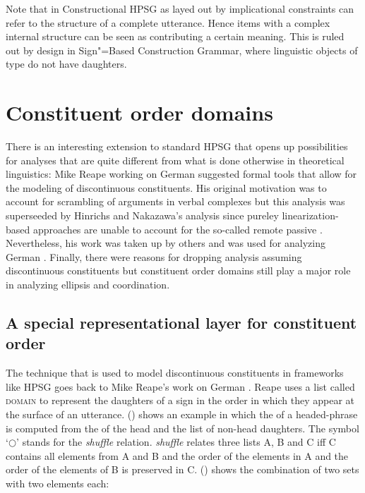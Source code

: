 \documentclass[output=paper]{langsci/langscibook}
\begin{document}
Note that in Constructional HPSG as layed out by  implicational constraints can refer
to the structure of a complete utterance. Hence items with a complex internal structure can be seen
as contributing a certain meaning. This is ruled out by design in Sign"=Based Construction Grammar,
where linguistic objects of type  do not have daughters.


\section{Constituent order domains}
\label{sec-domains}

There is an interesting extension to standard HPSG that opens up possibilities for analyses that are
quite different from what is done otherwise in theoretical linguistics: Mike Reape
\citeyearpar{Reape91,Reape92a,Reape94a} working on German suggested formal tools that allow for the modeling of
discontinuous constituents. His original motivation was to account for scrambling of arguments in
verbal complexes but this analysis was superseeded by Hinrichs and Nakazawa's analysis
\citep{HN89a,HN94a} since pureley linearization-based approaches are unable to account for the
so-called remote passive \citep{Kathol}. Nevertheless, his work was taken up by others and was used for analyzing German
\citep{KP95a,Kathol2000a,Mueller95c,Babel,Mueller2004b,Wetta2011a,Wetta2014a-u}. Finally, there were reasons for dropping
analysis assuming discontinuous constituents \citep{Mueller2005d,MuellerGS1} but constituent order
domains still play a major role in analyzing ellipsis and coordination.

\subsection{A special representational layer for constituent order}

\citet{Reape94a,Kathol2001a,Mueller2004b}

The technique that is used to model discontinuous constituents in frameworks like HPSG goes back to Mike Reape's work on German
\citeyearpar{Reape91,Reape92a,Reape94a}. 
Reape uses a list called \textsc{domain} to represent the daughters of a sign in the order in
which they appear at the surface of an utterance. () shows an example in which the \domv of a
headed-phrase is computed from the \domv of the head and the list of non-head daughters.
\ea
{} \impl
{}
\z
The symbol `$\bigcirc$'\is{$\bigcirc$}\label{rel-shuffle}
stands for the \emph{shuffle} relation. \emph{shuffle} relates three lists A, B and C iff C
contains all elements from A and B and the order of the elements in A and the order of the elements
of B is preserved in C. () shows the combination of two sets with two elements each:
\end{document}
